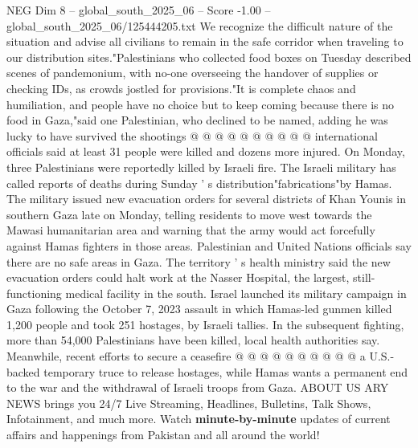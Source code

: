 \begin{textsample}{NEG Dim 8 – global\_south\_2025\_06 – Score -1.00 – global\_south\_2025\_06/125444205.txt}
We recognize the difficult nature of the situation and advise all civilians to remain in the safe corridor when traveling to our distribution sites."Palestinians who collected food boxes on Tuesday described scenes of pandemonium, with no-one overseeing the handover of supplies or checking IDs, as crowds jostled for provisions."It is complete chaos and humiliation, and people have no choice but to keep coming because there is no food in Gaza,"said one Palestinian, who declined to be named, adding he was lucky to have survived the shootings @ @ @ @ @ @ @ @ @ @ international officials said at least 31 people were killed and dozens more injured.
On Monday, three Palestinians were reportedly killed by Israeli fire.
The Israeli military has called reports of deaths during Sunday ' s distribution"fabrications"by Hamas.
The military issued new evacuation orders for several districts of Khan Younis in southern Gaza late on Monday, telling residents to move west towards the Mawasi humanitarian area and warning that the army would act forcefully against Hamas fighters in those areas.
Palestinian and United Nations officials say there are no safe areas in Gaza.
The territory ' s health ministry said the new evacuation orders could halt work at the Nasser Hospital, the largest, still-functioning medical facility in the south.
Israel launched its military campaign in Gaza following the October 7, 2023 assault in which Hamas-led gunmen killed 1,200 people and took 251 hostages, by Israeli tallies.
In the subsequent fighting, more than 54,000 Palestinians have been killed, local health authorities say.
Meanwhile, recent efforts to secure a ceasefire @ @ @ @ @ @ @ @ @ @ a U.S.-backed temporary truce to release hostages, while Hamas wants a permanent end to the war and the withdrawal of Israeli troops from Gaza.
ABOUT US ARY NEWS brings you 24/7 Live Streaming, Headlines, Bulletins, Talk Shows, Infotainment, and much more.
Watch \textbf{minute-by-minute} updates of current affairs and happenings from Pakistan and all around the world!

\end{textsample}

